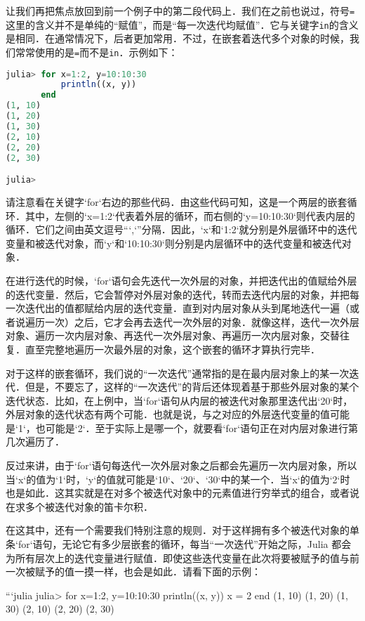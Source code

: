 让我们再把焦点放回到前一个例子中的第二段代码上．我们在之前也说过，符号\verb|=|这里的含义并不是单纯的“赋值”，而是“每一次迭代均赋值”．它与关键字\verb|in|的含义是相同．在通常情况下，后者更加常用．不过，在嵌套着迭代多个对象的时候，我们常常使用的是\verb|=|而不是\verb|in|．示例如下：
\begin{lstlisting}[language=julia]
julia> for x=1:2, y=10:10:30
           println((x, y))
       end
(1, 10)
(1, 20)
(1, 30)
(2, 10)
(2, 20)
(2, 30)

julia>
\end{lstlisting}

请注意看在关键字`for`右边的那些代码．由这些代码可知，这是一个两层的嵌套循环．其中，左侧的`x=1:2`代表着外层的循环，而右侧的`y=10:10:30`则代表内层的循环．它们之间由英文逗号“`,`”分隔．因此，`x`和`1:2`就分别是外层循环中的迭代变量和被迭代对象，而`y`和`10:10:30`则分别是内层循环中的迭代变量和被迭代对象．

在进行迭代的时候，`for`语句会先迭代一次外层的对象，并把迭代出的值赋给外层的迭代变量．然后，它会暂停对外层对象的迭代，转而去迭代内层的对象，并把每一次迭代出的值都赋给内层的迭代变量．直到对内层对象从头到尾地迭代一遍（或者说遍历一次）之后，它才会再去迭代一次外层的对象．就像这样，迭代一次外层对象、遍历一次内层对象、再迭代一次外层对象、再遍历一次内层对象，交替往复．直至完整地遍历一次最外层的对象，这个嵌套的循环才算执行完毕．

对于这样的嵌套循环，我们说的“一次迭代”通常指的是在最内层对象上的某一次迭代．但是，不要忘了，这样的“一次迭代”的背后还体现着基于那些外层对象的某个迭代状态．比如，在上例中，当`for`语句从内层的被迭代对象那里迭代出`20`时，外层对象的迭代状态有两个可能．也就是说，与之对应的外层迭代变量的值可能是`1`，也可能是`2`．至于实际上是哪一个，就要看`for`语句正在对内层对象进行第几次遍历了．

反过来讲，由于`for`语句每迭代一次外层对象之后都会先遍历一次内层对象，所以当`x`的值为`1`时，`y`的值就可能是`10`、`20`、`30`中的某一个．当`x`的值为`2`时也是如此．这其实就是在对多个被迭代对象中的元素值进行穷举式的组合，或者说在求多个被迭代对象的笛卡尔积．

在这其中，还有一个需要我们特别注意的规则．对于这样拥有多个被迭代对象的单条`for`语句，无论它有多少层嵌套的循环，每当“一次迭代”开始之际，Julia 都会为所有层次上的迭代变量进行赋值．即使这些迭代变量在此次将要被赋予的值与前一次被赋予的值一摸一样，也会是如此．请看下面的示例：

```julia
julia> for x=1:2, y=10:10:30
           println((x, y))
           x = 2
       end
(1, 10)
(1, 20)
(1, 30)
(2, 10)
(2, 20)
(2, 30)

